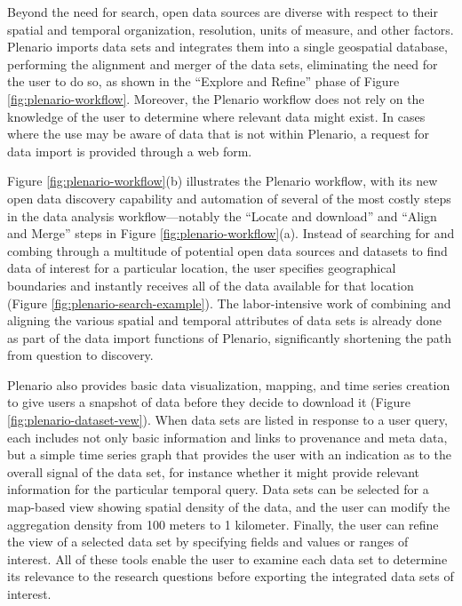 \documentclass[11pt]{article}
\begin{document}
Beyond the need for search, open data sources are diverse with respect to their spatial and temporal organization, resolution, units of measure, and other factors. Plenario imports data sets and integrates them into a single geospatial database, performing the alignment and merger of the data sets, eliminating the need for the user to do so, as shown in the ``Explore and Refine'' phase of Figure \ref{fig:plenario-workflow}. Moreover, the Plenario workflow does not rely on the knowledge of the user to determine where relevant data might exist. In cases where the use may be aware of data that is not within Plenario, a request for data import is provided through a web form.

Figure \ref{fig:plenario-workflow}(b) illustrates the Plenario workflow, with its new open data discovery capability and automation of several of the most costly steps in the data analysis workflow---notably the ``Locate and download'' and ``Align and Merge'' steps in Figure \ref{fig:plenario-workflow}(a). Instead of searching for and combing through a multitude of potential open data sources and datasets to find data of interest for a particular location, the user specifies geographical boundaries and instantly receives all of the data available for that location (Figure \ref{fig:plenario-search-example}). The labor-intensive work of combining and aligning the various spatial and temporal attributes of data sets is already done as part of the data import functions of Plenario, significantly shortening the path from question to discovery.

Plenario also provides basic data visualization, mapping, and time series creation to give users a snapshot of data before they decide to download it (Figure \ref{fig:plenario-dataset-vew}). When data sets are listed in response to a user query, each includes not only basic information and links to provenance and meta data, but a simple time series graph that provides the user with an indication as to the overall signal of the data set, for instance whether it might provide relevant information for the particular temporal query. Data sets can be selected for a map-based view showing spatial density of the data, and the user can modify the aggregation density from 100 meters to 1 kilometer. Finally, the user can refine the view of a selected data set by specifying fields and values or ranges of interest. All of these tools enable the user to examine each data set to determine its relevance to the research questions before exporting the integrated data sets of interest.
\end{document}

